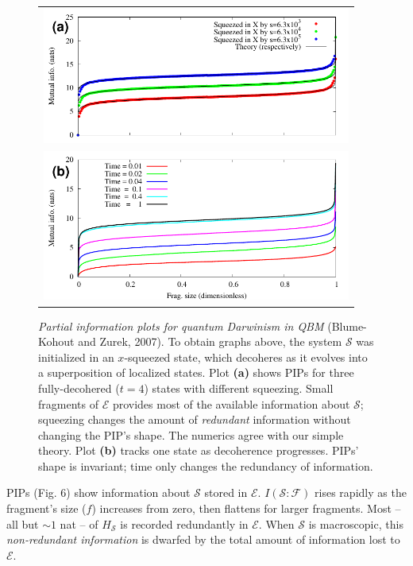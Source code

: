 \documentclass[aps,rmp,floatfix,11pt]{revtex4}
\newcommand{\Sys}{\ensuremath{\mathcal{S}}}
\newcommand{\Env}{\ensuremath{\mathcal{E}}}
\newcommand{\Hh}{\ensuremath{H}}
\newcommand{\Hs}{\ensuremath{\Hh_{\Sys}}}
\def\FCW{4in}
\newcommand{\cS}        {{\mathcal S}}
\newcommand{\cE}        {{\mathcal E}}
\newcommand{\+}         {\dagger}
\newcommand\cF{{\mathcal F}}
\begin{document}
{\begin{figure}[tb]
\begin{tabular}{l}
\vspace{-0.15in} \includegraphics[width=\FCW]{PIP1.pdf}\\
\includegraphics[width=\FCW]{PIP2.pdf}\\
\end{tabular}
\caption{\emph{Partial information plots for quantum Darwinism in QBM} (Blume-Kohout and Zurek, 2007). To obtain graphs above, the system $\Sys$ was initialized in an $x$-squeezed state, which decoheres as it evolves into a superposition of localized states.  Plot \textbf{(a)} shows PIPs for three fully-decohered ($t=4$) states with different squeezing.  Small fragments of $\Env$ provides most of the available information about $\Sys$; squeezing changes the amount of \emph{redundant} information without changing the PIP's shape.  The numerics agree with our simple theory.  Plot \textbf{(b)} tracks one state as decoherence progresses.  PIPs' shape is invariant; time only changes the redundancy of information.}
\label{figPIPs}
\end{figure}

PIPs (Fig. 6) show information about $\Sys$ stored in $\Env$.
$I(\cS :\cF )$ rises rapidly as the fragment's size ($f$) increases from zero,
then flattens for larger fragments.  
Most -- all but $\sim1$ nat -- of $\Hs$ is recorded redundantly in $\cE$.
When $\Sys$ is macroscopic, this \emph{non-redundant information}
is dwarfed by the total amount of information lost to $\Env$.

}
\end{document}
